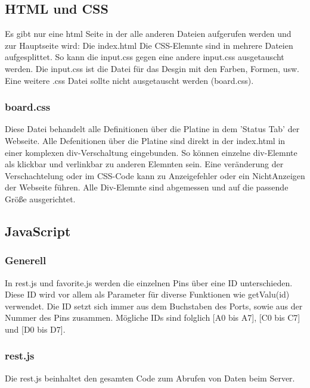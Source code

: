 \subsection{HTML und CSS}
Es gibt nur eine html Seite in der alle anderen Dateien aufgerufen werden und zur
Hauptseite wird: Die index.html\newline
Die CSS-Elemnte sind in mehrere Dateien aufgesplittet. So kann die input.css
gegen eine andere input.css ausgetauscht werden. Die input.css ist die Datei für
das Desgin mit den Farben, Formen, usw.\newline
Eine weitere .css Datei sollte nicht ausgetauscht werden (board.css).

\subsubsection{board.css}
Diese Datei behandelt alle Definitionen über die Platine in dem 'Status
Tab' der Webseite. Alle Defenitionen über die Platine sind direkt in der
index.html in einer komplexen div-Verschaltung eingebunden. So können einzelne
div-Elemnte als klickbar und verlinkbar zu anderen Elemnten sein. Eine
veränderung der Verschachtelung oder im CSS-Code kann zu Anzeigefehler oder ein
NichtAnzeigen der Webseite führen.\newline
Alle Div-Elemnte sind abgemessen und auf die passende Größe ausgerichtet. 

\subsection{JavaScript}
\subsubsection{Generell}
In \textrm{rest.js} und \textrm{favorite.js} werden die einzelnen Pins über eine
ID unterschieden. Diese ID wird vor allem als Parameter für diverse Funktionen
wie \textrm{getValu(id)} verwendet. Die ID setzt sich immer aus dem Buchstaben des
Ports, sowie aus der Nummer des Pins zusammen. Mögliche IDs sind folglich [A0
bis A7], [C0 bis C7] und [D0 bis D7].

\subsubsection{rest.js}
Die \textrm{rest.js} beinhaltet den gesamten Code zum Abrufen von Daten beim
Server.

